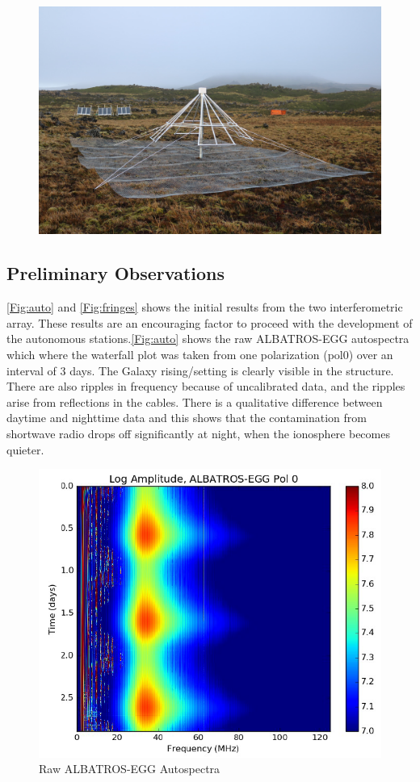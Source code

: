 \documentclass{ws-jai}
\begin{document}
	\begin{figure}[h]
		\begin{center}
			\includegraphics[width=0.7\linewidth]{Figures/autonomous.jpg}
			\caption{}
			\label{Fig:autonomous}
		\end{center}
	\end{figure}

 \subsection{Preliminary Observations}
	
\autoref{Fig:auto} and \autoref{Fig:fringes} shows the initial results from the two interferometric array. These results are an encouraging factor to proceed with the development of the autonomous stations.\autoref{Fig:auto} shows the raw ALBATROS-EGG autospectra which where the waterfall plot was taken from one polarization (pol0) over an interval of 3 days. The Galaxy rising/setting is clearly visible in the structure. There are also ripples in frequency because of uncalibrated data, and the ripples arise from reflections in the cables. There is a qualitative difference between daytime and nighttime data and this shows that the contamination from shortwave radio drops off significantly at night, when the ionosphere becomes quieter.

\begin{figure}[h!]
	\begin{center}
		\includegraphics[width=0.8\linewidth]{Figures/Raw-ALBATROS-autospectra.PNG}
		\caption{Raw ALBATROS-EGG Autospectra}
		\label{Fig:auto}
	\end{center}
\end{figure}
\end{document}
